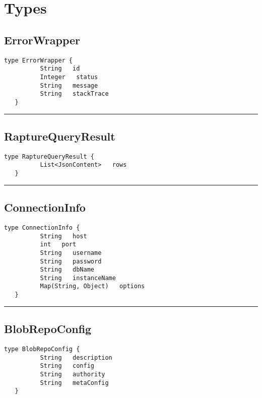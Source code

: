 \chapter{Types}
\section{ErrorWrapper}
\label{type:ErrorWrapper}

\begin{lstlisting}[style=nonumbers]
   type ErrorWrapper {
          String   id
          Integer   status
          String   message
          String   stackTrace
   }
\end{lstlisting}

\rule{12cm}{2pt}
\section{RaptureQueryResult}
\label{type:RaptureQueryResult}

\begin{lstlisting}[style=nonumbers]
   type RaptureQueryResult {
          List<JsonContent>   rows
   }
\end{lstlisting}

\rule{12cm}{2pt}
\section{ConnectionInfo}
\label{type:ConnectionInfo}

\begin{lstlisting}[style=nonumbers]
   type ConnectionInfo {
          String   host
          int   port
          String   username
          String   password
          String   dbName
          String   instanceName
          Map(String, Object)   options
   }
\end{lstlisting}

\rule{12cm}{2pt}
\section{BlobRepoConfig}
\label{type:BlobRepoConfig}

\begin{lstlisting}[style=nonumbers]
   type BlobRepoConfig {
          String   description
          String   config
          String   authority
          String   metaConfig
   }
\end{lstlisting}

